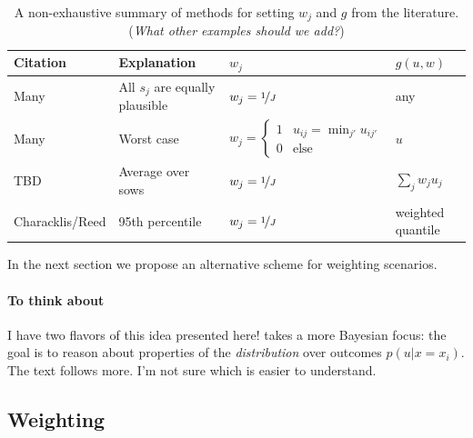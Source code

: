 \documentclass[12pt]{article}
\begin{document}
\begin{table}
    \centering
    \footnotesize
    \begin{tabular}{llll}
        \toprule
        Citation        & Explanation                     & $w_j$                                                                             & $g(u, w)$          \\
        \midrule
        Many            & All $s_j$ are equally plausible & $w_j = \nicefrac{1}{J}$                                                           & any                \\
        Many            & Worst case                      & $w_j = \begin{cases}1 & u_{ij} = \min_{j'} u_{ij'} \\ 0 & \text{else}\end{cases}$ & $u$                \\
        TBD             & Average over \glspl{sow}        & $w_j = \nicefrac{1}{J}$                                                           & $\sum_j w_j u_{j}$ \\
        Characklis/Reed & 95th percentile                 & $w_j = \nicefrac{1}{J}$                                                           & weighted quantile  \\
        \bottomrule
    \end{tabular}
    \caption{
        A non-exhaustive summary of methods for setting $w_j$ and $g$ from the literature.
        (\emph{What other examples should we add?})
    }\label{tab:literature-weighting}
\end{table}

In the next section we propose an alternative scheme for weighting scenarios.

\paragraph{To think  about}
I have two flavors of this idea presented here!
 takes a more Bayesian focus: the goal is to reason about properties of the \emph{distribution} over outcomes $p(u | x=x_i)$.
The text follows \citet{mcphail_robustness:2019} more.
I'm not sure which is easier to understand.

\subsection{Weighting }\label{sec:methods-weight}
\end{document}
